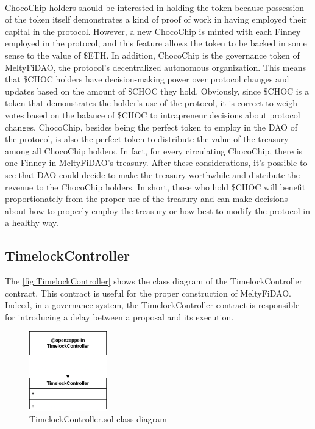 \\
\indent ChocoChip holders should be interested in holding the token because possession of the token itself demonstrates a kind of proof of work in having employed their capital in the protocol. However, a new ChocoChip is minted with each Finney employed in the protocol, and this feature allows the token to be backed in some sense to the value of \$ETH. In addition, ChocoChip is the governance token of MeltyFiDAO, the protocol's decentralized autonomous organization. This means that \$CHOC holders have decision-making power over protocol changes and updates based on the amount of \$CHOC they hold. Obviously, since \$CHOC is a token that demonstrates the holder's use of the protocol, it is correct to weigh votes based on the balance of \$CHOC to intrapreneur decisions about protocol changes. ChocoChip, besides being the perfect token to employ in the DAO of the protocol, is also the perfect token to distribute the value of the treasury among all ChocoChip holders. In fact, for every circulating ChocoChip, there is one Finney in MeltyFiDAO's treasury. After these considerations, it's possible to see that DAO could decide to make the treasury worthwhile and distribute the revenue to the ChocoChip holders. In short, those who hold \$CHOC will benefit proportionately from the proper use of the treasury and can make decisions about how to properly employ the treasury or how best to modify the protocol in a healthy way.

\subsection{TimelockController}
The \autoref{fig:TimelockController} shows the class diagram of the TimelockController contract. This contract is useful for the proper construction of MeltyFiDAO. Indeed, in a governance system, the TimelockController contract is responsible for introducing a delay between a proposal and its execution. 
\begin{figure}[h]
    \centering
    \includegraphics[width=0.3\textwidth]{figures/TimelockController_class_diagram.png}
    \caption{TimelockController.sol class diagram}
    \label{fig:TimelockController}
\end{figure}

